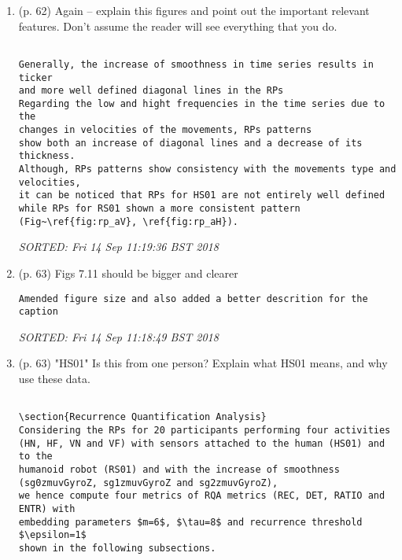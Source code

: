 \documentclass[10pt]{article}
\begin{document}
\begin{enumerate}[noitemsep,topsep=0pt]
\item (p. 62) Again -- explain this figures and point out the important 
	relevant features.
	Don't assume the reader will see everything that you do.


\begin{verbatim}

Generally, the increase of smoothness in time series results in ticker 
and more well defined diagonal lines in the RPs 
Regarding the low and hight frequencies in the time series due to the 
changes in velocities of the movements, RPs patterns
show both an increase of diagonal lines and a decrease of its thickness.
Although, RPs patterns show consistency with the movements type and velocities,
it can be noticed that RPs for HS01 are not entirely well defined
while RPs for RS01 shown a more consistent pattern
(Fig~\ref{fig:rp_aV}, \ref{fig:rp_aH}). 

\end{verbatim}
\textit{
SORTED: 
Fri 14 Sep 11:19:36 BST 2018
}
\\




\item (p. 63) Figs 7.11 should be bigger and clearer


\begin{verbatim}
Amended figure size and also added a better descrition for the caption
\end{verbatim}
\textit{
SORTED: 
Fri 14 Sep 11:18:49 BST 2018
}
\\






\item (p. 63) "HS01" Is this from one person? Explain what
	HS01 means, and why use these data.


\begin{verbatim}

\section{Recurrence Quantification Analysis}
Considering the RPs for 20 participants performing four activities 
(HN, HF, VN and VF) with sensors attached to the human (HS01) and to the 
humanoid robot (RS01) and with the increase of smoothness 
(sg0zmuvGyroZ, sg1zmuvGyroZ and sg2zmuvGyroZ), 
we hence compute four metrics of RQA metrics (REC, DET, RATIO and ENTR) with 
embedding parameters $m=6$, $\tau=8$ and recurrence threshold $\epsilon=1$ 
shown in the following subsections.


\end{verbatim}
\end{enumerate}
\end{document}
